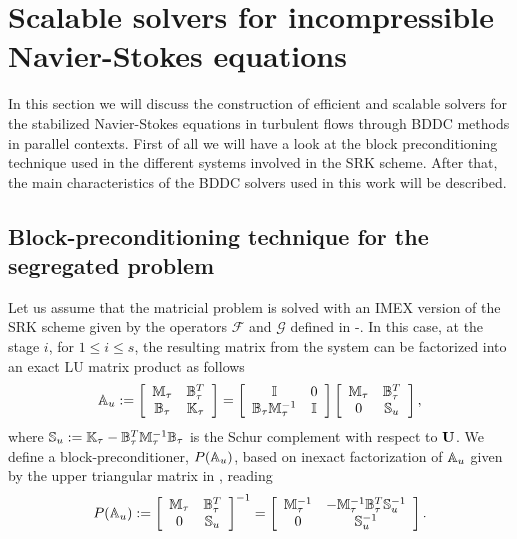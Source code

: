 \section{Scalable solvers for incompressible Navier-Stokes equations}
\label{sec-C7_solver}
In this section we will discuss the construction of efficient and scalable solvers for the stabilized Navier-Stokes equations in turbulent flows through BDDC methods in parallel contexts. First of all we will have a look at the block preconditioning technique used in the different systems involved in the SRK scheme. After that, the main characteristics of the BDDC solvers used in this work will be described.

\subsection{Block-preconditioning technique for the segregated problem}
\label{subsec-C7_block_prec}
Let us assume that the matricial problem  is solved with an IMEX version of the SRK scheme given by the operators $ \mathcal{F} $ and $ \mathcal{G} $ defined in -. In this case, at the stage $ i $, for $ 1\le i \le s $, the resulting matrix from the system  can be factorized into an exact LU matrix product as follows
\begin{equation}
\label{eq-C7_SRK_u_mat}
\mathbb{A}_u:=\left[\begin{array}{cc}
\mathbb{M}_\tau&\mathbb{B}_\tau^T\\
\mathbb{B}_\tau&\mathbb{K}_\tau
\end{array}\right]=\left[\begin{array}{cc}
\mathbb{I}&0\\
\mathbb{B}_\tau\mathbb{M}_\tau^{-1}&\mathbb{I}
\end{array}\right]\left[\begin{array}{cc}
\mathbb{M}_\tau&\mathbb{B}_\tau^T\\
0&\mathbb{S}_u
\end{array}\right],
\end{equation}
where $ \mathbb{S}_u:=\mathbb{K}_\tau-\mathbb{B}_\tau^T\mathbb{M}_\tau^{-1}\mathbb{B}_\tau$ is the Schur complement with respect to ${\bf U}$. We define a block-preconditioner, $ P(\mathbb{A}_u) $, based on inexact factorization of $ \mathbb{A}_u $ given by the upper triangular matrix in , reading
\begin{equation}
\label{eq-C7_SRK_u_prec}
P(\mathbb{A}_u):=\left[\begin{array}{cc}
\mathbb{M}_\tau&\mathbb{B}_\tau^T\\
0&\mathbb{S}_u
\end{array}\right]^{-1}=\left[\begin{array}{cc}
\mathbb{M}_\tau^{-1}&-\mathbb{M}_\tau^{-1}\mathbb{B}_\tau^T\mathbb{S}_u^{-1}\\
0&\mathbb{S}_u^{-1}
\end{array}\right].
\end{equation}

